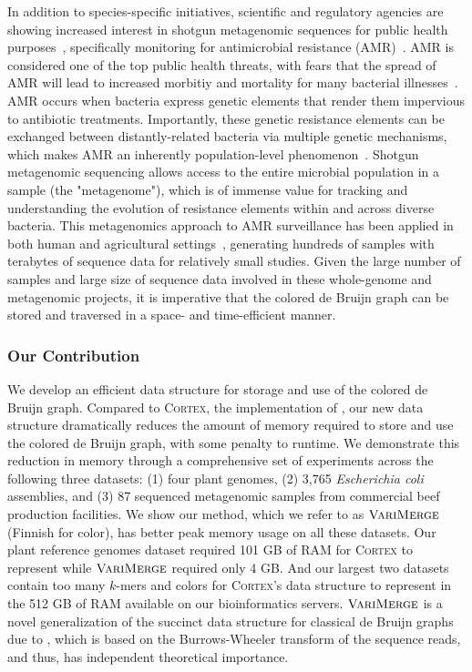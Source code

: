 In addition to species-specific initiatives, scientific and regulatory agencies are showing increased interest in shotgun metagenomic sequences for public health purposes~\citep{EMBL-EBI-Metagenomics,Miller2013}, specifically monitoring for antimicrobial resistance (AMR)~\cite{baquero_metagenomic_epi, port_2014_metagenomics_AMR_monitoring}.  AMR is considered one of the top public health threats, with fears that the spread of AMR will lead to increased morbitiy and mortality for many bacterial illnesses~\citep{CARB,FAOActionPlan2016}.  AMR occurs when bacteria express genetic elements that render them impervious to antibiotic treatments.  Importantly, these genetic resistance elements can be exchanged between distantly-related bacteria via multiple genetic mechanisms, which makes AMR an inherently population-level phenomenon~\citep{Baquero2013}.   Shotgun metagenomic sequencing allows access to the entire microbial population in a sample (the "metagenome"), which is of immense value for tracking and understanding the evolution of resistance elements within and across diverse bacteria\citep{MacLean2010}.  This metagenomics approach to AMR surveillance has been applied in both human and agricultural settings~\citep{noyes2016resistome,King2016}, generating hundreds of samples with terabytes of sequence data for relatively small studies.  Given the large number of samples and large size of sequence data involved in these whole-genome and metagenomic projects, it is imperative that the colored de Bruijn graph can be stored and traversed in a space- and time-efficient manner.


\subsubsection{Our Contribution}
We develop an efficient data structure for storage and use of the colored de Bruijn graph. Compared to \textsc{Cortex}, the implementation of \cite{ICTFM12}, our new data structure dramatically reduces the amount of memory required to store and use the colored de Bruijn graph, with some penalty to runtime. We demonstrate this reduction in memory through a comprehensive set of experiments across the following three datasets: (1)  four plant genomes, (2) 3,765 \emph{Escherichia coli} assemblies,
and (3) 87 sequenced metagenomic samples from commercial beef production facilities.  We show our method, which we refer to as $\mbox{\rm {\sc VariMerge}}$ (Finnish for color), has better peak memory usage on all these datasets. Our plant reference genomes dataset required 101 GB of RAM for  \textsc{Cortex} to represent while $\mbox{\rm {\sc VariMerge}}$ required only 4 GB.  And  our
largest two datasets contain too many $k$-mers and colors for \textsc{Cortex}'s data structure to represent in the 512 GB of RAM available on our bioinformatics servers. $\mbox{\rm {\sc VariMerge}}$ is a novel generalization of the succinct data structure for classical de Bruijn graphs due to \cite{BOSS12}, which is based on the Burrows-Wheeler transform of the sequence reads, and thus, has independent theoretical importance.

